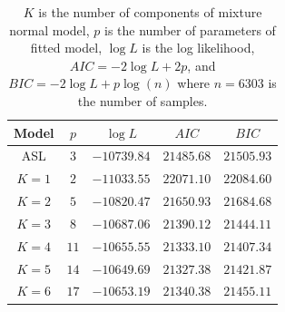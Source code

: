 \begin{table}[h]
  \centering
  \begin{tabular}{ccccc} \hline\hline
  Model & $p$  & $\log L$    & $AIC$      & $BIC$ \\ \hline
  ASL   & $3$  & $-10739.84$ & $21485.68$ & $21505.93$ \\
  $K=1$ & $2$  & $-11033.55$ & $22071.10$ & $22084.60$ \\
  $K=2$ & $5$  & $-10820.47$ & $21650.93$ & $21684.68$ \\
  $K=3$ & $8$  & $-10687.06$ & $21390.12$ & $21444.11$ \\
  $K=4$ & $11$ & $-10655.55$ & $21333.10$ & $21407.34$ \\
  $K=5$ & $14$ & $-10649.69$ & $21327.38$ & $21421.87$ \\
  $K=6$ & $17$ & $-10653.19$ & $21340.38$ & $21455.11$ \\
  \hline\hline
  \end{tabular}
  \caption{$K$ is the number of components of mixture normal model,
           $p$ is the number of parameters of fitted model,
           $\log L$ is the log likelihood, $AIC = -2 \log L + 2p$, and
           $BIC = -2 \log L + p\log(n)$ where $n = 6303$ is
           the number of samples.}
  \label{tab:asl_mixture}
\end{table}
